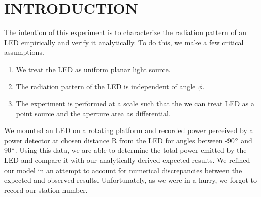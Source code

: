 \section{INTRODUCTION}
The intention of this experiment is to characterize the radiation pattern of an LED empirically and verify it analytically. To do this, we make a few critical assumptions.
\begin{enumerate}
\item We treat the LED as uniform planar light source.
\item The radiation pattern of the LED is independent of angle $\phi$.
\item The experiment is performed at a scale such that the we can treat LED as a point source and the aperture area as differential.
\end{enumerate}

We mounted an LED on a rotating platform and recorded power perceived by a power detector at chosen distance R from the LED for angles between -90$\degree$ and 90$\degree$. Using this data, we are able to determine the total power emitted by the LED and compare it with our analytically derived expected results. We refined our model in an attempt to account for numerical discrepancies between the expected and observed results. Unfortunately, as we were in a hurry, we forgot to record our station number.